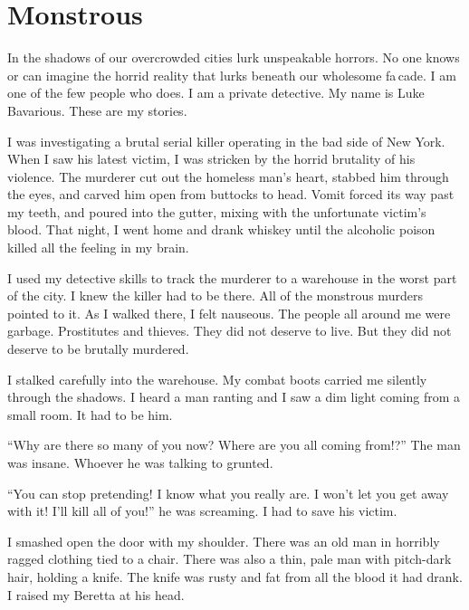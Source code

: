 \chapter{Monstrous}


In the shadows of our overcrowded cities lurk unspeakable horrors.
No one knows or can imagine the horrid reality that lurks beneath
our wholesome fa\,cade. I am one of the few people who does. I
am a private detective. My name is Luke Bavarious. These are my
stories.



I was investigating a brutal serial killer operating in the bad
side of New York. When I saw his latest victim, I was stricken by
the horrid brutality of his violence. The murderer cut out the
homeless man's heart, stabbed him through the eyes, and
carved him open from buttocks to head. Vomit forced its way past my
teeth, and poured into the gutter, mixing with the unfortunate
victim's blood. That night, I went home and drank whiskey
until the alcoholic poison killed all the feeling in my
brain.



I used my detective skills to track the murderer to a warehouse in
the worst part of the city. I knew the killer had to be there. All
of the monstrous murders pointed to it. As I walked there, I felt
nauseous. The people all around me were garbage. Prostitutes and
thieves. They did not deserve to live. But they did not deserve to
be brutally murdered.



I stalked carefully into the warehouse. My combat boots carried me
silently through the shadows. I heard a man ranting and I saw a dim
light coming from a small room. It had to be him.



``Why are there so many of you now? Where are you all coming
from!?'' The man was insane. Whoever he was talking to
grunted.



``You can stop pretending! I know what you really are. I
won't let you get away with it! I'll kill all of
you!'' he was screaming. I had to save his victim.



I smashed open the door with my shoulder. There was an old man in
horribly ragged clothing tied to a chair. There was also a thin,
pale man with pitch-dark hair, holding a knife. The knife was rusty
and fat from all the blood it had drank. I raised my Beretta at his
head.



